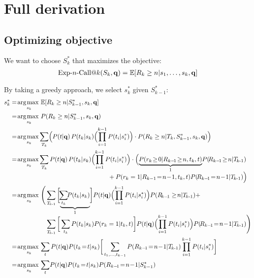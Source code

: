 \section{Full derivation}
\subsection{Optimizing objective}
We want to choose $S_k^*$ that maximizes the objective:
\begin{align*}
  \ExpNCall{n}(S_k,\vec{q})
  = \mathbb{E}[R_k\geq n|s_1,\dots,s_k,\vec{q}]
\end{align*}

\noindent
By taking a greedy approach, we select $s_k^*$ given $S_{k-1}^*$:
\begin{align}
  s_k^* & = \argmax_{s_k} \mathbb{E}[R_k\geq n|S_{k-1}^*,s_k,\vec{q}] \nonumber\\
% 
  & = \argmax_{s_k} P(R_k\geq n|S_{k-1}^*,s_k,\vec{q}) \label{note1}\\
%
  & = \argmax_{s_k} \!\sum_{T_k} \Bigl( P(t|\vec{q}) \,P(t_k|s_k) \Bigl( \prod_{i=1}^{k-1} P(t_i|s_i^*) \Bigr) \cdot P(R_k\geq n|T_k,S_{k-1}^*,s_k,\vec{q}) \Bigr) \label{note2}\\
%
  & = \argmax_{s_k} \!\sum_{T_k} P(t|\vec{q}) \,P(t_k|s_k) \Bigl( \prod_{i=1}^{k-1} P(t_i|s_i^*) \Bigr) \cdot \Bigl( \mbox{$\underbrace{P(r_k\!\geq\!0|R_{k-\!1}\!\geq\!n,t_k,t)}_{1}$} P(\!R_{k-\!1}\!\geq\!n|\TlessK) \nonumber \\[-1.5mm]
  & \hspace{55mm} + P(r_k=1|R_{k-1}\!=\!n\!-\!1,t_k,t) P(\!R_{k-\!1}\!=\!n\!-\!1|\TlessK) \Big) \label{note3}\\
%
  & = \argmax_{s_k} \Bigg( \sum_{\TlessK} \bigg[ \mbox{$\underbrace{ \!\sum_{t_k} \!\!P(t_k|s_k) }_{1}$} \bigg] P(t|\vec{q}) \Bigl( \prod_{i=1}^{k-1} P(t_i|s_i^*) \Bigr) P(R_{\!k-\!1}\geq\!n|\TlessK) + \nonumber \\[-1.5mm]
  & \hspace{20mm} \sum_{\TlessK} \bigg[ \sum_{t_k} P(t_k|s_k) P(r_k=1|t_k,t) \bigg] P(t|\vec{q}) \Bigl( \prod_{i=1}^{k-1} P(t_i|s_i^*) \Bigr) P(\!R_{k-\!1}\!=\!n\!-\!1|\TlessK) \Bigg) \nonumber\\
%
  & = \argmax_{s_k} \sum_{t} P(t|\vec{q}) P(t_k\!=\!t|s_k) \bigg[ \sum_{t_1, \dots, t_{k-1}}  P(R_{k-\!1}\!=\!n\!-\!1|\TlessK) \prod_{i=1}^{k-1} P(t_i|s_i^*) \bigg] \label{note4}\\
%
  & = \argmax_{s_k} \sum_{t} \!P(t|\vec{q}) P(t_k\!=\!t|s_k) P(R_{k-\!1}\!=\!n\!-\!1|S_{k-1}^*) \label{eq.ncall}
\end{align}


